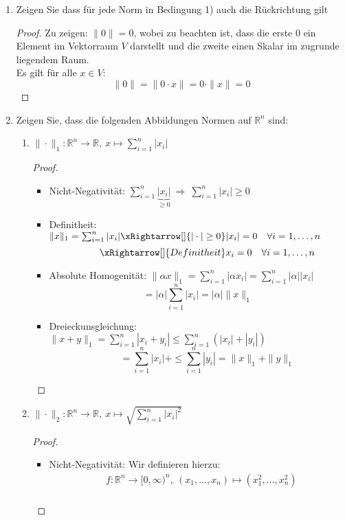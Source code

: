 \documentclass[12pt]{extreport} %
\newcommand{\R}{\mathbb{R}}
\theoremstyle{named}
\theoremstyle{nnamed}
\theoremstyle{itshape}
\theoremstyle{normal}
\begin{document}
\begin{enumerate}
	\item Zeigen Sie dass für jede Norm in Bedingung 1) auch die Rückrichtung gilt
		\begin{proof}
			Zu zeigen: $\| 0 \| = 0$, wobei zu beachten ist, dass die erste 0 ein Element im Vektorraum $V$ darstellt und die zweite einen Skalar im zugrunde liegendem Raum. ~\\

			Es gilt für alle $x \in V$:
			$$\| 0 \| = \| 0 \cdot x \| = 0 \cdot \| x \| = 0 $$
		\end{proof}
	\item Zeigen Sie, dass die folgenden Abbildungen Normen auf $\R^n$ sind:
		\begin{enumerate}
			\item $\| \cdot \|_{1} \colon \R^n \rightarrow \R, ~ x \mapsto \sum_{i = 1}^{n} |x_i|$
				\begin{proof} ~\
					\begin{itemize}
						\item Nicht-Negativität: $\sum_{i=1}^{n} \underbrace{|x_i|}_{\geq 0} ~\Rightarrow ~\sum_{i=1}^{n} |x_i| \geq 0$
						\item Definitheit: $\| x \|_1 = \sum_{i=1}^{n} |x_i| \xRightarrow[]{|\cdot| \geq 0} |x_i| = 0 \quad \forall i = 1, \dotsc, n$
								$$ \qquad \xRightarrow[]{Definitheit} x_i = 0 \quad \forall i = 1, \dotsc, n $$
						\item Absolute Homogenität: $	\| \alpha x \|_1 = \sum_{i=1}^{n} |  \alpha x_i|  = \sum_{i=1}^{n} |\alpha| |x_i|$
							$$= |\alpha| \sum_{i=1}^{n} |x_i|  = |\alpha| \| x \|_1 $$
						\item Dreieckunsgleichung:	$\| x + y\|_1    = \sum_{i=1}^{n} | x_i   +   y_i |  \leq \sum_{i=1}^{n} \left( | x_i | + | y_i | \right)$
									$$\qquad  = \sum_{i=1}^{n} | x_i | + \leq \sum_{i=1}^{n} | y_i |   = \| x \|_1 + \| y \|_1 $$	
					\end{itemize}
				\end{proof}
			\item  $\| \cdot \|_{2} \colon \R^n \rightarrow \R, ~ x \mapsto \sqrt{\sum_{i = 1}^{n} |x_i|^2}$
				\begin{proof} ~\
					\begin{itemize}
						\item Nicht-Negativität: Wir definieren hierzu:
							\begin{align*}
								& f \colon \R^n \rightarrow [0, \infty)^n, ~(x_1, \dotsc, x_n) \mapsto (x_1^2, \dotsc, x_n^2) \\

\end{align*}
\end{itemize}
\end{proof}
\end{enumerate}
\end{enumerate}
\end{document}
